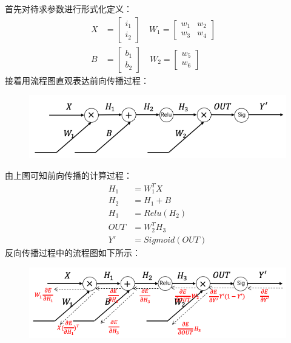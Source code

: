\documentclass{article}
\begin{document}
\section{}
首先对待求参数进行形式化定义：
\begin{equation}
	\begin{aligned}
	X&=\begin{bmatrix}i_1\\i_2\end{bmatrix}\quad W_1=\begin{bmatrix}w_1& w_2\\w_3 & w_4\end{bmatrix}\quad \\B&=\begin{bmatrix}b_1\\b_2\end{bmatrix}\quad W_2=\begin{bmatrix}w_5\\w_6\end{bmatrix}
	\end{aligned}
\end{equation}
接着用流程图直观表达前向传播过程：
\begin{figure}[H]
	\centering
	\includegraphics[scale=0.7]{forward.png}
\end{figure}
由上图可知前向传播的计算过程：
\begin{equation}
	\begin{aligned}
	H_1 &= W_1^TX\\
	H_2 &= H_1+B\\
	H_3 &= Relu(H_2)\\
	OUT &= W_2^TH_3\\
	Y' &= Sigmoid(OUT)
	\end{aligned}
\end{equation}
反向传播过程中的流程图如下所示：
\begin{figure}[H]
	\centering
	\includegraphics[scale=0.7]{backward.png}
\end{figure}
\end{document}
